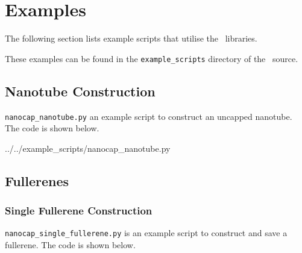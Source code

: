 \section{Examples}\label{Examples}

The following section lists example scripts that utilise the \nanocap~libraries. %

%   

These examples can be found in the \texttt{example\_scripts} directory of the \nanocap~source.


\subsection{Nanotube Construction}

\verb|nanocap_nanotube.py| an example script to construct an uncapped nanotube. The code is shown below.

%
			{../../example_scripts/nanocap_nanotube.py}

\subsection{Fullerenes}

\subsubsection{Single Fullerene Construction}

\verb|nanocap_single_fullerene.py| is an example script to construct and save a fullerene. The code is shown below.

